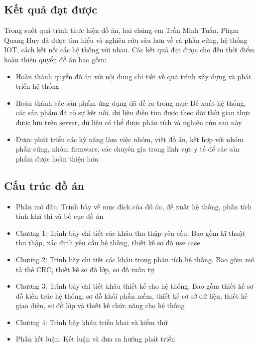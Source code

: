 \subsection*{Kết quả đạt được}

Trong suốt quá trình thực hiện đồ án, hai chúng em Trần Minh Tuấn, Phạm Quang Huy đã được tìm hiểu và nghiên cứu sâu hơn về cả phần cứng,
hệ thống IOT, cách kết nối các hệ thống với nhau. Các kết quả đạt được cho đến thời điểm hoàn thiện quyển đồ án bao gồm:

\begin{adjustwidth}{1.5em}{}
  \begin{itemize}
      \item Hoàn thành quyển đồ án với nội dung chi tiết về quá trình xây dựng và phát triển hệ thống
      \item Hoàn thành các sản phẩm ứng dụng đã đề ra trong mục Đề xuất hệ thống, các sản phẩm đã có sự kết nối, dữ liệu điện tim được theo dõi
      thời gian thực được lưu trên server, dữ liệu có thể được phân tích và nghiên cứu sau này
      \item Được phát triển các kỹ năng làm việc nhóm, viết đồ án, kết hợp với nhóm phần cứng, nhóm firmware, các chuyên gia trong lĩnh vực y tế để các sản phẩm được hoàn thiện hơn
    \end{itemize}
  \end{adjustwidth}
\subsection*{Cấu trúc đồ án}

\begin{adjustwidth}{1.5em}{}
\begin{itemize}
  \item Phần mở đầu: Trình bày về mục đích của đồ án, đề xuất hệ thống, phần tích tính khả thi và bố cục đồ án
  \item Chương 1: Trình bày chi tiết các khâu thu thập yêu cầu. Bao gồm kĩ thuật thu thập, xác định yêu cầu hệ thống, thiết kế sơ đồ use case
  \item Chương 2: Trình bày chi tiết các khâu trong phân tích hệ thống. Bao gồm mô tả thẻ CRC, thiết kế sơ đồ lớp, sơ đồ tuần tự
  \item Chương 3: Trình bày chi tiết khâu thiết kế cho hệ thống. Bao gồm thiết kế sơ đồ kiến trúc hệ thống, sơ đồ khối
  phần mềm, thiết kế cơ sở dữ liệu, thiết kế giao diện, sơ đồ lớp và thiết kế chức năng cho hệ thống
  \item Chương 4: Trình bày khâu triền khai và kiểm thử
  \item Phần kết luận: Kết luận và đưa ra hướng phát triển 
\end{itemize}
\end{adjustwidth}

\cleardoublepage

